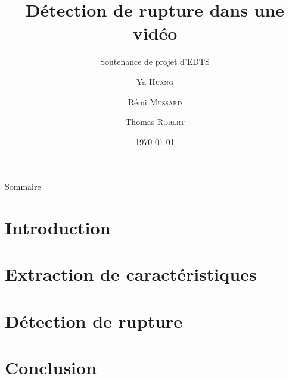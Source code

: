 \documentclass[compress,xcolor=table]{beamer}
\title{Détection de rupture dans une vidéo}
\subtitle{Soutenance de projet d'EDTS}
\date{\today}
\author{Ya \textsc{Huang} \and Rémi \textsc{Mussard} \and Thomas \textsc{Robert}}
\institute{Institut National des Sciences Appliquées de Rouen}
\begin{document}
\begin{frame}[plain]
	\titlepage
    \setcounter{framenumber}{0}
\end{frame}

\begin{frame}{Sommaire}
\begin{minipage}{\textwidth}
   \linespread{1.35}
	\tableofcontents[hideallsubsections]
\end{minipage}
\end{frame}

\section{Introduction}
\subsection{}


\section{Extraction de caractéristiques}
\subsection{}


\section{Détection de rupture}
\subsection{}


\section{Conclusion}
\subsection{}

\end{document}
